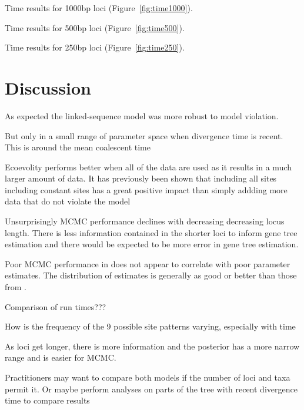 






Time results for 1000bp loci (Figure~\ref{fig:time1000}).

Time results for 500bp loci (Figure~\ref{fig:time500}).

Time results for 250bp loci (Figure~\ref{fig:time250}).

\section{Discussion}

As expected the linked-sequence model was more robust to model violation.

But only in a small range of parameter space when divergence time is recent. This
is around the mean coalescent time

Ecoevolity performs better when all of the data are used as it results in a much larger 
amount of data. It has previously been shown that including all sites including 
constant sites has a great positive impact than simply addding more data that 
do not violate the model \citep{Oaks2018ecoevolity}

Unsurprisingly MCMC performance declines with decreasing decreasing locus length.
There is less information contained in the shorter loci to inform gene tree estimation 
and there would be expected to be more error in gene tree estimation.

Poor MCMC performance in \beast does not appear to correlate with poor parameter 
estimates. The distribution of estimates is generally as good or better than those 
from \ecoevolity. 

Comparison of run times???

How is the frequency of the 9 possible site patterns varying, especially with time

As loci get longer, there is more information and the posterior has a more 
narrow range and is easier for MCMC.

Practitioners may want to compare both models if the number of loci and taxa
permit it. Or maybe perform analyses on parts of the tree with recent divergence
time to compare results 
